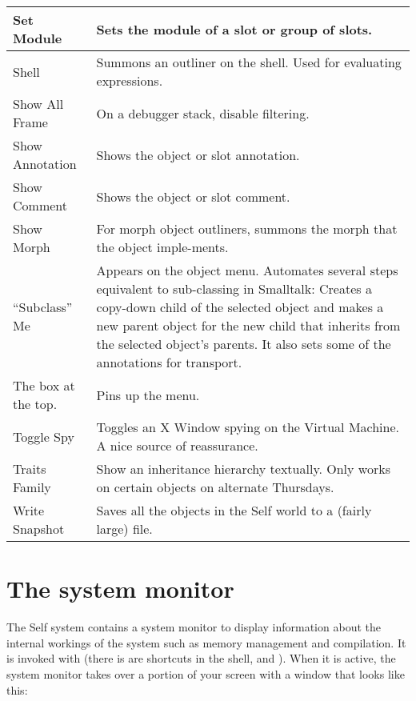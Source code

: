 \documentclass[letterpaper,10pt,english]{sphinxmanual}
\begin{document}
\begin{longtable}{p{5cm} p{10cm}}
\\
\hline
Set Module
&
Sets the module of a slot or group of slots.
\\
\hline
Shell
&
Summons an outliner on the shell. Used for evaluating expressions.
\\
\hline
Show All Frame
&
On a debugger stack, disable filtering.
\\
\hline
Show Annotation
&
Shows the object or slot annotation.
\\
\hline
Show Comment
&
Shows the object or slot comment.
\\
\hline
Show Morph
&
For morph object outliners, summons the morph that the object imple-ments.
\\
\hline
“Subclass” Me
&
Appears on the object menu. Automates several steps equivalent to sub-classing in Smalltalk: Creates a copy-down child of the selected object and makes a new parent object for the new child that inherits from the selected object’s parents. It also sets some of the annotations for transport.
\\
\hline
The box at the top.
&
Pins up the menu.
\\
\hline
Toggle Spy
&
Toggles an X Window spying on the Virtual Machine. A nice source of reassurance.
\\
\hline
Traits Family
&
Show an inheritance hierarchy textually. Only works on certain objects on alternate Thursdays.
\\
\hline
Write Snapshot
&
Saves all the objects in the Self world to a (fairly large) file.
\\
\hline\end{longtable}



\section{The system monitor}
\label{\detokenize{monitor:pp-the-system-monitor}}\label{\detokenize{monitor::doc}}\label{\detokenize{monitor:the-system-monitor}}
The Self system contains a system monitor to display information about the internal workings of
the system such as memory management and compilation. It is invoked with   (there
is are shortcuts in the shell,  and ). When it is active, the system monitor takes over
a portion of your screen with a window that looks like this:
\begin{figure}[htbp]
\centering

\noindent{}
\end{figure}
\end{document}
